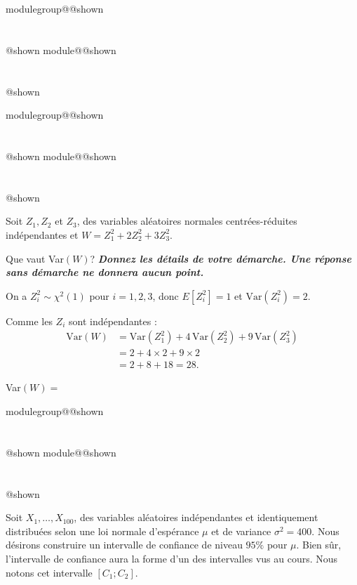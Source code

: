 \documentclass{Evaluation}
\makeatletter
\newcommand{\currentmodulekey}{}
\newcommand{\currentmoduletitle}{}
\newcommand{\currentgroupkey}{}
\newcommand{\currentgrouptitle}{}
\newcommand{\showmoduleifneeded}{%
  \ifx\currentgroupkey\empty\else
    \expandafter\ifx\csname modulegroup@\currentgroupkey @shown\endcsname\relax
      \section*{\currentgrouptitle}%
      \expandafter\gdef\csname modulegroup@\currentgroupkey @shown\endcsname{1}%
    \fi
  \fi
  \expandafter\ifx\csname module@\currentmodulekey @shown\endcsname\relax
    \section*{\currentmoduletitle}%
    \expandafter\gdef\csname module@\currentmodulekey @shown\endcsname{1}%
  \fi
}
\newenvironment{H23}{\showmoduleifneeded}{}
\newenvironment{A23}{\showmoduleifneeded}{}
\makeatother
\begin{document}
\begin{questions}
\begin{H23}
\end{H23}

\begin{A23}
\question {} %
Soit $Z_1,Z_2$ et $Z_{3}$, des variables aléatoires normales centrées-réduites indépendantes et $\displaystyle W=Z_1^2+2Z_2^2+3Z_3^2$. 

Que vaut Var$(W)$? \textbf{\textit{Donnez les détails de votre démarche. Une réponse sans démarche ne donnera aucun point.}}

\begin{solution}
On a $Z_i^2 \sim \chi^2(1)$ pour $i=1,2,3$, donc $E[Z_i^2]=1$ et $\text{Var}(Z_i^2)=2$.

Comme les $Z_i$ sont indépendantes :
\begin{align*}
\text{Var}(W) &= \text{Var}(Z_1^2) + 4\,\text{Var}(Z_2^2) + 9\,\text{Var}(Z_3^2) \\
&= 2 + 4\times 2 + 9\times 2 \\
&= 2 + 8 + 18 = 28.
\end{align*}
\end{solution}

Var$(W)=$
\end{A23}

\begin{A23}
\question {} %
Soit $X_1,\hdots, X_{100}$, des variables aléatoires indépendantes et identiquement distribuées selon une loi normale d’espérance $\mu$ et de variance $\sigma^2 = 400$. 
Nous désirons construire un intervalle de confiance de niveau $95\%$ pour $\mu$. Bien sûr, l'intervalle de confiance aura la forme d'un des intervalles vus au cours. Nous notons cet intervalle $[C_1;C_2]$.
\begin{parts}

\end{parts}
\end{A23}
\end{questions}
\end{document}
